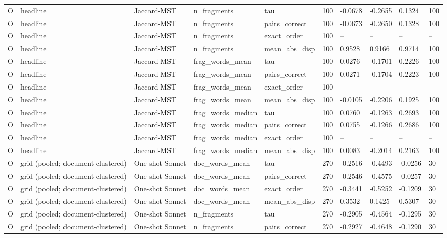 \begin{table}[t]
{\begin{tabular}{llllllllll}
O & headline & Jaccard-MST & n\_fragments & tau & 100 & -0.0678 & -0.2655 & 0.1324 & 100 \\
O & headline & Jaccard-MST & n\_fragments & pairs\_correct & 100 & -0.0673 & -0.2650 & 0.1328 & 100 \\
O & headline & Jaccard-MST & n\_fragments & exact\_order & 100 & -- & -- & -- & -- \\
O & headline & Jaccard-MST & n\_fragments & mean\_abs\_disp & 100 & 0.9528 & 0.9166 & 0.9714 & 100 \\
O & headline & Jaccard-MST & frag\_words\_mean & tau & 100 & 0.0276 & -0.1701 & 0.2226 & 100 \\
O & headline & Jaccard-MST & frag\_words\_mean & pairs\_correct & 100 & 0.0271 & -0.1704 & 0.2223 & 100 \\
O & headline & Jaccard-MST & frag\_words\_mean & exact\_order & 100 & -- & -- & -- & -- \\
O & headline & Jaccard-MST & frag\_words\_mean & mean\_abs\_disp & 100 & -0.0105 & -0.2206 & 0.1925 & 100 \\
O & headline & Jaccard-MST & frag\_words\_median & tau & 100 & 0.0760 & -0.1263 & 0.2693 & 100 \\
O & headline & Jaccard-MST & frag\_words\_median & pairs\_correct & 100 & 0.0755 & -0.1266 & 0.2686 & 100 \\
O & headline & Jaccard-MST & frag\_words\_median & exact\_order & 100 & -- & -- & -- & -- \\
O & headline & Jaccard-MST & frag\_words\_median & mean\_abs\_disp & 100 & 0.0083 & -0.2014 & 0.2163 & 100 \\
O & grid (pooled; document-clustered) & One-shot Sonnet & doc\_words\_mean & tau & 270 & -0.2516 & -0.4493 & -0.0256 & 30 \\
O & grid (pooled; document-clustered) & One-shot Sonnet & doc\_words\_mean & pairs\_correct & 270 & -0.2546 & -0.4575 & -0.0257 & 30 \\
O & grid (pooled; document-clustered) & One-shot Sonnet & doc\_words\_mean & exact\_order & 270 & -0.3441 & -0.5252 & -0.1209 & 30 \\
O & grid (pooled; document-clustered) & One-shot Sonnet & doc\_words\_mean & mean\_abs\_disp & 270 & 0.3532 & 0.1425 & 0.5307 & 30 \\
O & grid (pooled; document-clustered) & One-shot Sonnet & n\_fragments & tau & 270 & -0.2905 & -0.4564 & -0.1295 & 30 \\
O & grid (pooled; document-clustered) & One-shot Sonnet & n\_fragments & pairs\_correct & 270 & -0.2927 & -0.4648 & -0.1290 & 30 \\

\end{tabular}}
\end{table}
